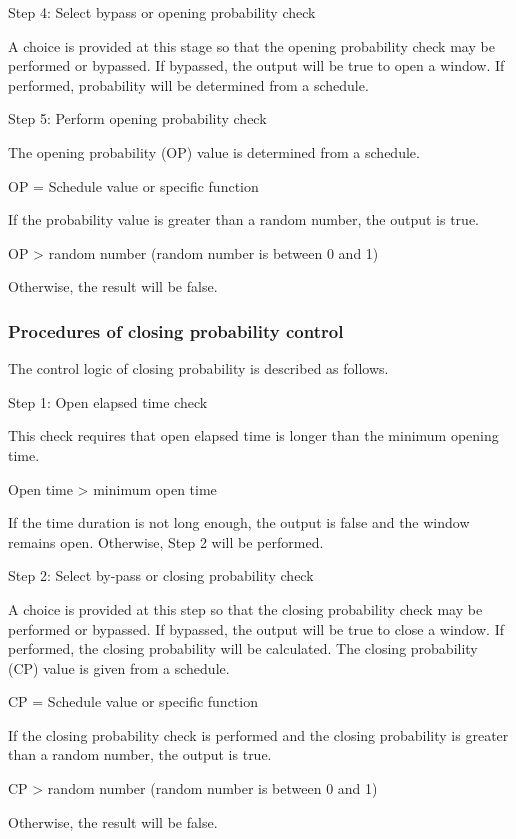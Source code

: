 Step 4: Select bypass or opening probability check

A choice is provided at this stage so that the opening probability check may be performed or bypassed. If bypassed, the output will be true to open a window. If performed, probability will be determined from a schedule.

Step 5: Perform opening probability check

The opening probability (OP) value is determined from a schedule.

OP = Schedule value or specific function

If the probability value is greater than a random number, the output is true.

OP \textgreater{} random number (random number is between 0 and 1)

Otherwise, the result will be false.

\subsubsection{Procedures of closing probability control}\label{procedures-of-closing-probability-control}

The control logic of closing probability is described as follows.

Step 1: Open elapsed time check

This check requires that open elapsed time is longer than the minimum opening time.

Open time \textgreater{} minimum open time

If the time duration is not long enough, the output is false and the window remains open. Otherwise, Step 2 will be performed.

Step 2: Select by-pass or closing probability check

A choice is provided at this step so that the closing probability check may be performed or bypassed. If bypassed, the output will be true to close a window. If performed, the closing probability will be calculated. The closing probability (CP) value is given from a schedule.

CP = Schedule value or specific function

If the closing probability check is performed and the closing probability is greater than a random number, the output is true.

CP \textgreater{} random number (random number is between 0 and 1)

Otherwise, the result will be false.

